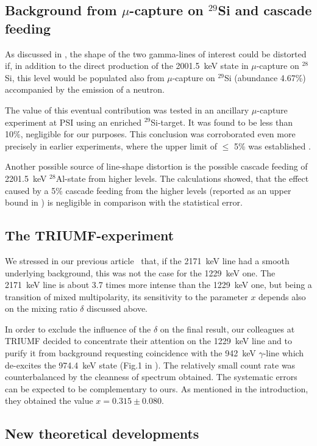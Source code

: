 \subsection{Background from $\mu$-capture on $^{29}$Si and cascade
feeding}
As discussed in \cite{Brudanin95}, the shape of the two gamma-lines of
interest
could be distorted if, in addition to the direct production of the
2001.5~keV 
state in $\mu$-capture on $^{28}$Si, this level would be populated
also from $\mu$-capture
on $^{29}$Si (abundance 4.67\%) accompanied by the emission of a
neutron.

The value of this eventual contribution was tested in an ancillary
$\mu$-capture
experiment at PSI using an enriched $^{29}$Si-target. It was found to be
less than 
10\%, negligible for our purposes. This conclusion was corroborated even
more 
precisely in earlier experiments, where the upper limit of $\leq$ 5\%
was established 
\cite{Miller72}.

Another possible source of line-shape distortion is the possible cascade
feeding 
of 2201.5~keV $^{28}$Al-state from higher levels. The calculations
showed, that
the effect caused by a 5\% cascade feeding from the higher levels
(reported as an upper
bound in \cite{Moftah97}) is negligible in comparison with the
statistical error.

\subsection{The TRIUMF-experiment}
We stressed in our previous article~\cite[see Fig.4]{Brudanin95} 
that, if the 2171~keV line
had a smooth underlying background, this was not the case for the
1229~keV one. The 2171~keV line is about 3.7 times more intense than the
1229~keV one,
but being a transition of mixed multipolarity, its sensitivity to the
parameter $x$
depends also on the mixing ratio $\delta$ discussed above.

In order to exclude the influence of the $\delta$ on the final result,
our colleagues 
at TRIUMF decided to concentrate their attention on the 1229~keV line
and to purify it from background requesting coincidence with the 942~keV
$\gamma$-line
which de-excites the 974.4~keV state (Fig.1 in \cite{Moftah97}). The
relatively
small count rate was counterbalanced by the cleanness of spectrum
obtained. 
The systematic errors can be expected to be complementary to ours.
As mentioned in the introduction, they obtained the value $x = 0.315 \pm
0.080$.

\subsection{New theoretical developments}

